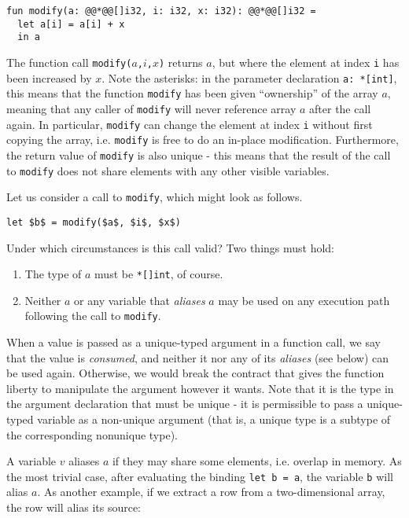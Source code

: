 \documentclass[oneside,11pt]{book}
\begin{document}
\begin{lstlisting}
fun modify(a: @@*@@[]i32, i: i32, x: i32): @@*@@[]i32 =
  let a[i] = a[i] + x
  in a
\end{lstlisting}

The function call \texttt{modify($a$,$i$,$x$)} returns $a$, but where
the element at index \texttt{i} has been increased by $x$.  Note the
asterisks: in the parameter declaration \texttt{a: *[int]}, this means
that the function \texttt{modify} has been given ``ownership'' of the
array $a$, meaning that any caller of \texttt{modify} will never
reference array $a$ after the call again.  In particular,
\texttt{modify} can change the element at index \texttt{i} without
first copying the array, i.e. \texttt{modify} is free to do an
in-place modification.  Furthermore, the return value of
\texttt{modify} is also unique - this means that the result of the
call to \texttt{modify} does not share elements with any other visible
variables.

Let us consider a call to \texttt{modify}, which might look as
follows.

\begin{lstlisting}[mathescape=true]
let $b$ = modify($a$, $i$, $x$)
\end{lstlisting}

Under which circumstances is this call valid?  Two things must hold:
\begin{enumerate}
\item The type of \texttt{$a$} must be \texttt{*[]int}, of course.

\item Neither \texttt{$a$} or any variable that \textit{aliases}
  \texttt{$a$} may be used on any execution path following the call to
  \texttt{modify}.
\end{enumerate}

When a value is passed as a unique-typed argument in a function call,
we say that the value is \textit{consumed}, and neither it nor any of
its \textit{aliases} (see below) can be used again.  Otherwise, we
would break the contract that gives the function liberty to manipulate
the argument however it wants.  Note that it is the type in the
argument declaration that must be unique - it is permissible to pass a
unique-typed variable as a non-unique argument (that is, a unique type
is a subtype of the corresponding nonunique type).

A variable $v$ aliases $a$ if they may share some elements,
i.e. overlap in memory.  As the most trivial case, after evaluating
the binding \texttt{let b = a}, the variable \texttt{b} will alias
\texttt{$a$}.  As another example, if we extract a row from a
two-dimensional array, the row will alias its source:
\end{document}
